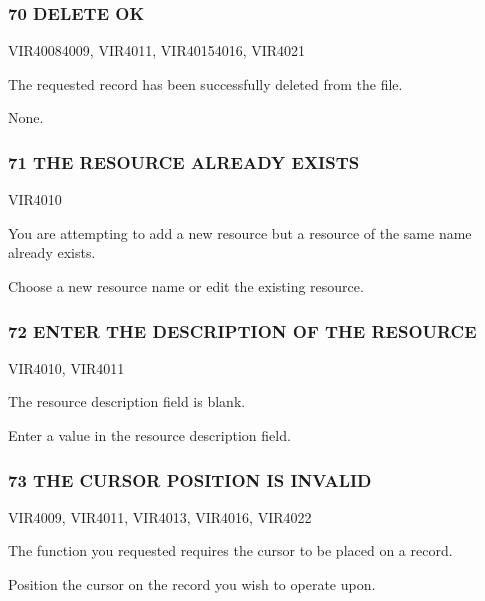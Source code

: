 \documentclass[letterpaper,10pt,english]{sphinxmanual}
\begin{document}
\subsubsection{70 DELETE OK}
\label{\detokenize{messages:id3}}\begin{description}
\sphinxAtStartPar
VIR4008\sphinxhyphen{}4009, VIR4011, VIR4015\sphinxhyphen{}4016, VIR4021

\sphinxAtStartPar
The requested record has been successfully deleted from the file.

\sphinxAtStartPar
None.

\end{description}


\subsubsection{71 THE RESOURCE ALREADY EXISTS}
\label{\detokenize{messages:the-resource-already-exists}}\begin{description}
\sphinxAtStartPar
VIR4010

\sphinxAtStartPar
You are attempting to add a new resource but a resource of the same name already exists.

\sphinxAtStartPar
Choose a new resource name or edit the existing resource.

\end{description}


\subsubsection{72 ENTER THE DESCRIPTION OF THE RESOURCE}
\label{\detokenize{messages:enter-the-description-of-the-resource}}\begin{description}
\sphinxAtStartPar
VIR4010, VIR4011

\sphinxAtStartPar
The resource description field is blank.

\sphinxAtStartPar
Enter a value in the resource description field.

\end{description}


\subsubsection{73 THE CURSOR POSITION IS INVALID}
\label{\detokenize{messages:the-cursor-position-is-invalid}}\begin{description}
\sphinxAtStartPar
VIR4009, VIR4011, VIR4013, VIR4016, VIR4022

\sphinxAtStartPar
The function you requested requires the cursor to be placed on a record.

\sphinxAtStartPar
Position the cursor on the record you wish to operate upon.

\end{description}
\end{document}
